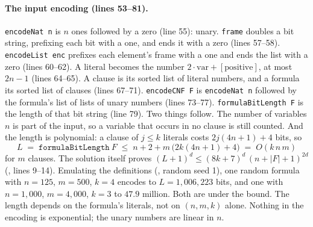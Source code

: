 \paragraph{The input encoding (lines 53--81).}
\texttt{encodeNat n} is \(n\) ones followed by a zero (line 55): unary.
\texttt{frame} doubles a bit string, prefixing each bit with a one, and
ends it with a zero (lines 57--58). \texttt{encodeList enc} prefixes each
element's frame with a one and ends the list with a zero (lines 60--62).
A literal becomes the number \(2\cdot\mathrm{var} + [\text{positive}]\),
at most \(2n - 1\) (lines 64--65). A clause is its sorted list of literal
numbers, and a formula its sorted list of clauses (lines 67--71).
\texttt{encodeCNF F} is \texttt{encodeNat n} followed by the formula's
list of lists of unary numbers (lines 73--77).
\texttt{formulaBitLength F} is the length of that bit string (line 79).
Two things follow. The number of variables \(n\) is part of the input,
so a variable that occurs in no clause is still counted. And the length
is polynomial: a clause of \(j \le k\) literals costs \(2j(4n+1)+4\) bits,
so
\[
  L \;=\; \mathtt{formulaBitLength}\ F \;\le\; n + 2 + m\,\bigl(2k(4n+1) + 4\bigr)
  \;=\; O(k\,n\,m)
\]
for \(m\) clauses. The solution itself proves
\((L+1)^d \le (8k+7)^d\,(n + |F| + 1)^{2d}\)
(, lines 9--14). Emulating the
definitions (,
random seed 1), one random formula with \(n = 125\), \(m = 500\),
\(k = 4\) encodes to \(L = 1{,}006{,}223\) bits, and one with
\(n = 1{,}000\), \(m = 4{,}000\), \(k = 3\) to \(47.9\) million. Both are
under the bound. The length depends on the formula's literals, not on
\((n, m, k)\) alone. Nothing in the
encoding is exponential; the unary numbers are linear in \(n\).

